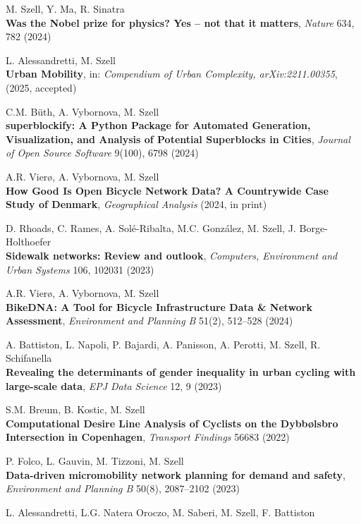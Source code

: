 \documentclass[10pt,a4paper]{article}
\begin{document}
\begin{etaremune}
\item M. Szell, Y. Ma, R. Sinatra\\
    \textbf{Was the Nobel prize for physics? Yes -- not that it matters},
    \textit{Nature} 634, 782 (2024)
\item L. Alessandretti, M. Szell\\
    \textbf{Urban Mobility}, in: \textit{Compendium of Urban Complexity, arXiv:2211.00355}, (2025, accepted)
\item C.M. Büth, A. Vybornova, M. Szell\\
    \textbf{superblockify: A Python Package for Automated Generation, Visualization, and Analysis of Potential Superblocks in Cities}, 
    \textit{Journal of Open Source Software} 9(100), 6798 (2024)
\item A.R. Vierø, A. Vybornova, M. Szell\\
    \textbf{How Good Is Open Bicycle Network Data? A Countrywide Case Study of Denmark}, \textit{Geographical Analysis} (2024, in print)
\item D. Rhoads, C. Rames, A. Solé-Ribalta, M.C. González, M. Szell, J. Borge-Holthoefer\\
    \textbf{Sidewalk networks: Review and outlook},
    \textit{Computers, Environment and Urban Systems} 106, 102031 (2023)
\item A.R. Vierø, A. Vybornova, M. Szell\\
    \textbf{BikeDNA: A Tool for Bicycle Infrastructure Data \& Network Assessment},
    \textit{Environment and Planning B} 51(2), 512--528 (2024)
\item A. Battiston, L. Napoli, P. Bajardi, A. Panisson, A. Perotti, M. Szell, R. Schifanella\\
    \textbf{Revealing the determinants of gender inequality in urban cycling with large-scale data}, 
    \textit{EPJ Data Science} 12, 9 (2023)
\item S.M. Breum, B. Kostic, M. Szell\\
    \textbf{Computational Desire Line Analysis of Cyclists on the Dybbølsbro Intersection in Copenhagen}, \textit{Transport Findings} 56683 (2022)
\item P. Folco, L. Gauvin, M. Tizzoni, M. Szell\\
    \textbf{Data-driven micromobility network planning for demand and safety}, \textit{Environment and Planning B} 50(8), 2087--2102 (2023)
\item L. Alessandretti, L.G. Natera Oroczo, M. Saberi, M. Szell, F. Battiston\\

\end{etaremune}
\end{document}
